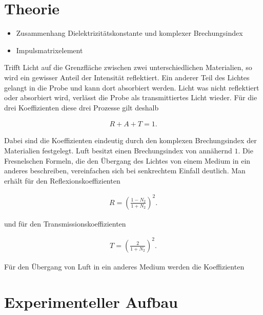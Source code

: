 \documentclass[paper=a4,fontsize=10pt,DIV=18,twocolumn,parskip=half]{scrartcl}
\numberwithin{equation}{section}    %
\begin{document}

\section{Theorie}
\begin{itemize}
\item Zusammenhang Dielektrizitätskonstante und komplexer Brechungsindex
\item Impulsmatrixelement
\end{itemize}
Trifft Licht auf die Grenzfläche zwischen zwei unterschiedlichen Materialien, so wird ein gewisser Anteil der Intensität reflektiert. Ein anderer Teil des Lichtes gelangt in die Probe und kann dort absorbiert werden. Licht was nicht reflektiert oder absorbiert wird, verlässt die Probe als transmittiertes Licht wieder. Für die drei Koeffizienten diese drei Prozesse gilt deshalb

\begin{align}
    R+A+T=1.
\end{align}

Dabei sind die Koeffizienten eindeutig durch den komplexen Brechungsindex der Materialien festgelegt. Luft besitzt einen Brechungsindex von annähernd $1$.
Die Fresnelschen Formeln, die den Übergang des Lichtes von einem Medium in ein anderes beschreiben, vereinfachen sich bei senkrechtem Einfall deutlich. Man erhält für den Reflexionskoeffizienten

\begin{align}
    R=(\frac{1-N_2}{1+N_2})^2.
\end{align}

und für den Transmissionskoeffizienten 

\begin{align}
    T=(\frac{2}{1+N_2})^2.
\end{align}


Für den Übergang von Luft in ein anderes Medium werden die Koeffizienten 





\section{Experimenteller Aufbau}
\end{document}
